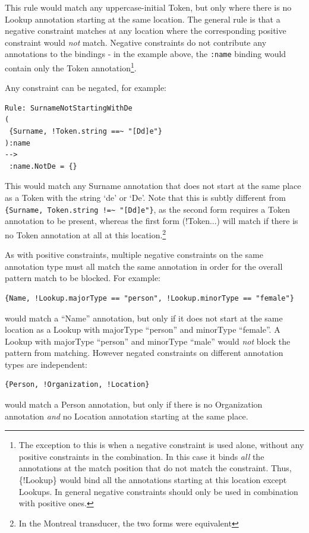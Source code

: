 This rule would match any uppercase-initial Token, but only where there is no
Lookup annotation starting at the same location.  The general rule is that a
negative constraint matches at any location where the corresponding positive
constraint would \emph{not} match.  Negative constraints do not contribute any
annotations to the bindings - in the example above, the \verb|:name| binding
would contain only the Token annotation\footnote{The exception to this is when a
negative constraint is used alone, without any positive constraints in the
combination.  In this case it binds \emph{all} the annotations at the match
position that do not match the constraint.  Thus, \{!Lookup\} would bind
all the annotations starting at this location except Lookups.  In general
negative constraints should only be used in combination with positive ones.}.

Any constraint can be negated, for example:

\begin{small}
\begin{verbatim}
Rule: SurnameNotStartingWithDe
(
 {Surname, !Token.string ==~ "[Dd]e"}
):name
-->
 :name.NotDe = {}
\end{verbatim}
\end{small}

This would match any Surname annotation that does not start at the same place
as a Token with the string `de' or `De'.  Note that this is subtly different
from \verb|{Surname, Token.string !=~ "[Dd]e"}|, as the second form requires a
Token annotation to be present, whereas the first form (!Token...) will match
if there is no Token annotation at all at this location.\footnote{In the
Montreal transducer, the two forms were equivalent}

As with positive constraints, multiple negative constraints on the same
annotation type must all match the same annotation in order for the overall
pattern match to be blocked.  For example:
\begin{small}
\begin{verbatim}
{Name, !Lookup.majorType == "person", !Lookup.minorType == "female"}
\end{verbatim}
\end{small}
would match a ``Name'' annotation, but only if it does not start at the same
location as a Lookup with majorType ``person'' and minorType ``female''.  A
Lookup with majorType ``person'' and minorType ``male'' would {\em not} block
the pattern from matching.  However negated constraints on different annotation
types are independent:
\begin{small}
\begin{verbatim}
{Person, !Organization, !Location}
\end{verbatim}
\end{small}
would match a Person annotation, but only if there is no Organization
annotation {\em and} no Location annotation starting at the same place.

